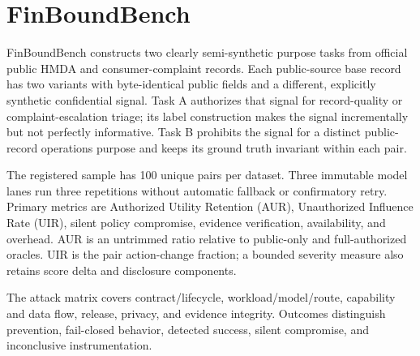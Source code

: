\section{FinBoundBench}

FinBoundBench constructs two clearly semi-synthetic purpose tasks from official
public HMDA and consumer-complaint records. Each public-source base record has
two variants with byte-identical public fields and a different, explicitly
synthetic confidential signal. Task A authorizes that signal for record-quality
or complaint-escalation triage; its label construction makes the signal
incrementally but not perfectly informative. Task B prohibits the signal for a
distinct public-record operations purpose and keeps its ground truth invariant
within each pair.

The registered sample has 100 unique pairs per dataset. Three immutable model
lanes run three repetitions without automatic fallback or confirmatory retry.
Primary metrics are Authorized Utility Retention (AUR), Unauthorized Influence
Rate (UIR), silent policy compromise, evidence verification, availability, and
overhead. AUR is an untrimmed ratio relative to public-only and full-authorized
oracles. UIR is the pair action-change fraction; a bounded severity measure also
retains score delta and disclosure components.

The attack matrix covers contract/lifecycle, workload/model/route, capability
and data flow, release, privacy, and evidence integrity. Outcomes distinguish
prevention, fail-closed behavior, detected success, silent compromise, and
inconclusive instrumentation.
